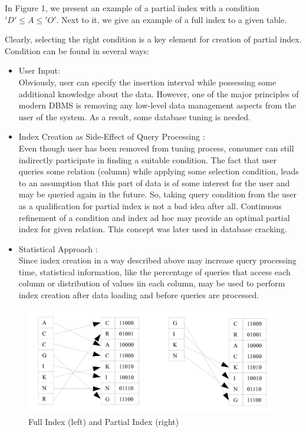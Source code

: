 \documentclass[10pt, conference, compsocconf]{IEEEtran}
\begin{document}
In Figure 1, we present an example of a partial index with a condition $'D' \leq A \leq 'O'$. Next to it, we give an example of a full index to a given table.

Clearly, selecting the right condition is a key element for creation of partial index. Condition can be found in several ways:\\
\begin{itemize}

\item{User Input:}\\ Obviously, user can specify the insertion interval while possessing some additional knowledge about the data. However, one of the major principles of modern DBMS is removing any low-level data management aspects from the user of the system. As a result, some database tuning is needed.\\

\item{Index Creation as Side-Effect of Query Processing \cite{partial1}:}\\ Even though user has been removed from tuning process, consumer can still indirectly participate in finding a suitable condition. The fact that user queries some relation (column) while applying some selection condition, leads to an assumption that this part of data is of some interest for the user and may be queried again in the future. So, taking query condition from the user as a qualification for partial index is not a bad idea after all. Continuous refinement of a condition and index ad hoc may provide an optimal partial index for given relation. This concept was later used in database cracking.\\

\item{Statistical Approach \cite{partial2}:} \\Since index creation in a way described above may increase query processing time, statistical information, like the percentage of queries that access each column or distribution of values iin each column, may be used to perform index creation after data loading and before queries are processed.
\end{itemize}

\begin{figure}[h]
\centering
\includegraphics[width=\columnwidth]{partial.png}
\caption{Full Index (left) and Partial Index (right)}
\end{figure}
\end{document}
